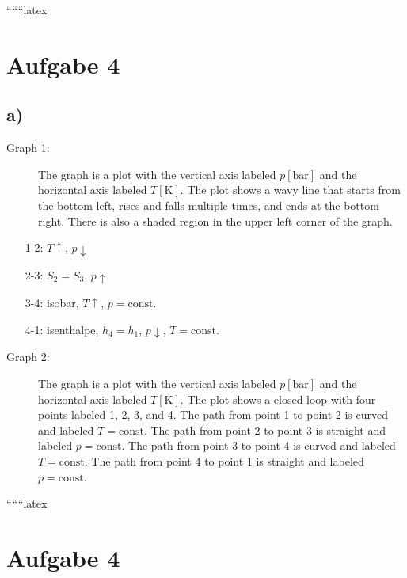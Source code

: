 
``````latex


\section*{Aufgabe 4}

\subsection*{a)}

\begin{description}
    \item[Graph 1:] The graph is a plot with the vertical axis labeled \( p[\text{bar}] \) and the horizontal axis labeled \( T[\text{K}] \). The plot shows a wavy line that starts from the bottom left, rises and falls multiple times, and ends at the bottom right. There is also a shaded region in the upper left corner of the graph.
\end{description}

\begin{itemize}
    \item[1-2:] \( T \uparrow \), \( p \downarrow \)
    \item[2-3:] \( S_2 = S_3 \), \( p \uparrow \)
    \item[3-4:] isobar, \( T \uparrow \), \( p = \text{const.} \)
    \item[4-1:] isenthalpe, \( h_4 = h_1 \), \( p \downarrow \), \( T = \text{const.} \)
\end{itemize}

\begin{description}
    \item[Graph 2:] The graph is a plot with the vertical axis labeled \( p[\text{bar}] \) and the horizontal axis labeled \( T[\text{K}] \). The plot shows a closed loop with four points labeled 1, 2, 3, and 4. The path from point 1 to point 2 is curved and labeled \( T = \text{const} \). The path from point 2 to point 3 is straight and labeled \( p = \text{const} \). The path from point 3 to point 4 is curved and labeled \( T = \text{const} \). The path from point 4 to point 1 is straight and labeled \( p = \text{const} \).
\end{description}

``````latex

\section*{Aufgabe 4}


